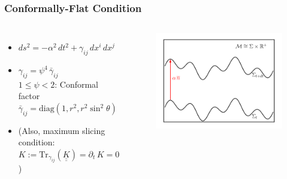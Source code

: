 \documentclass{beamer}
\newcommand{\p}{\partial}
\newcommand{\ul}{\underline}
\begin{document}
\begin{frame}
\frametitle{Conformally-Flat Condition}

  \citet{wmm1996,cc2009}

  \begin{columns}[c]


    \begin{itemize}[<+->]
      \item[]
        $ds^{2}=-\alpha^{2}\,dt^{2}+\gamma_{ij}\,dx^{i}\,dx^{j}$\\[1em]
      \item[]
        $\gamma_{ij}=\psi^{4}\,\bar{\gamma}_{ij}$\\[1em]
        $1\leq\psi<2$: Conformal factor\\[1em]
        $\bar{\gamma}_{ij}
        =\mathrm{diag}\left(1,r^{2},r^{2}\sin^{2}\theta\right)$\\[1em]
      \item[]
        (Also, maximum slicing condition:
        $K:=\mathrm{Tr}_{\gamma_{ij}}\left(\ul{\ul{K}}\right)=\p_{t}\,K=0$)
    \end{itemize}


      \begin{figure}[htb!]
        \centering
        \includegraphics[width=\textwidth]{1+1a.png}
      \end{figure}

  \end{columns}

\end{frame}
\end{document}
